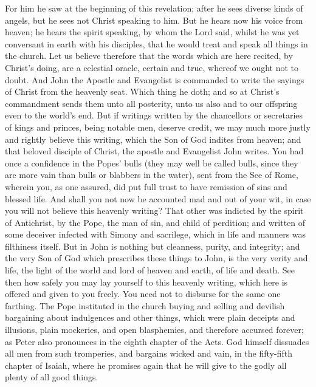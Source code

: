 For him he saw at the beginning of this revelation; after he sees diverse kinds of angels, but he sees not Christ speaking to him. But he hears now his voice from heaven; he hears the spirit speaking, by whom the Lord said, whilst he was yet conversant in earth with his disciples, that he would treat and speak all things in the church. Let us believe therefore that the words which are here recited, by Christ’s doing, are a celestial oracle, certain and true, whereof we ought not to doubt. And John the Apostle and Evangelist is commanded to write the sayings of Christ from the heavenly seat. Which thing he doth; and so at Christ’s commandment sends them unto all posterity, unto us also and to our offspring even to the world’s end. But if writings written by the chancellors or secretaries of kings and princes, being notable men, deserve credit, we may much more justly and rightly believe this writing, which the Son of God indites from heaven; and that beloved disciple of Christ, the apostle and Evangelist John writes. You had once a confidence in the Popes’ bulls (they may well be called bulls, since they are more vain than bulls or blabbers in the water), sent from the See of Rome, wherein you, as one assured, did put full trust to have remission of sins and blessed life. And shall you not now be accounted mad and out of your wit, in case you will not believe this heavenly writing? That other was indicted by the spirit of Antichrist, by the Pope, the man of sin, and child of perdition; and written of some deceiver infected with Simony and sacrilege, which in life and manners was filthiness itself. But in John is nothing but cleanness, purity, and integrity; and the very Son of God which prescribes these things to John, is the very verity and life, the light of the world and lord of heaven and earth, of life and death. See then how safely you may lay yourself to this heavenly writing, which here is offered and given to you freely. You need not to disburse for the same one farthing. The Pope instituted in the church buying and selling and devilish bargaining about indulgences and other things, which were plain deceipts and illusions, plain mockeries, and open blasphemies, and therefore accursed forever; as Peter also pronounces in the eighth chapter of the Acts. God himself dissuades all men from such tromperies, and bargains wicked and vain, in the fifty-fifth chapter of Isaiah, where he promises again that he will give to the godly all plenty of all good things.

